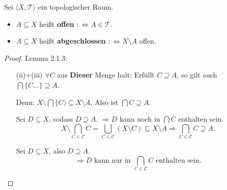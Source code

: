 {
  Sei $\langle X, \mathcal{T} \rangle$ ein topologischer Raum.  
  \begin{itemize}
  \item $A \subseteq X$ heißt \textbf{offen} $:\Leftrightarrow A \in \mathcal{T}$.
  \item $A \subseteq X$ heißt \textbf{abgeschlossen} $:\Leftrightarrow X \setminus A$ offen.
  \end{itemize}
}



\begin{proof}{Lemma 2.1.3: }\\
\begin{enumerate}
  \item[(ii)+(iii)]  
  $\forall C$ aus \textbf{Dieser} Menge halt:  
  Erfüllt $C \supseteq A$, so gilt auch $\bigcap \{C\dots\} \supseteq A$.  

  Denn:  
  $X \setminus \bigcap \{C) \subseteq X \setminus A$.  
  Also ist $\bigcap C \supseteq A$.

  Sei $D \subseteq X$, sodass $D \supseteq A$.  
  $\Rightarrow D$ kann noch in $\bigcap C$ enthalten sein.
\begin{equation*}
X \setminus \bigcap_{C \in \mathcal{C}} C 
= \bigcup_{C \in \mathcal{C}} (X \setminus C)
\subseteq X \setminus A
\Rightarrow
\bigcap_{C \in \mathcal{C}} C \supseteq A.
\end{equation*}

Sei $D \subseteq X$, also $D \supseteq A$.  
$$
\Rightarrow D \text{ kann nur in } \bigcap_{C \in \mathcal{C}} C \text{ enthalten sein.}
$$
\end{enumerate}
\end{proof}

